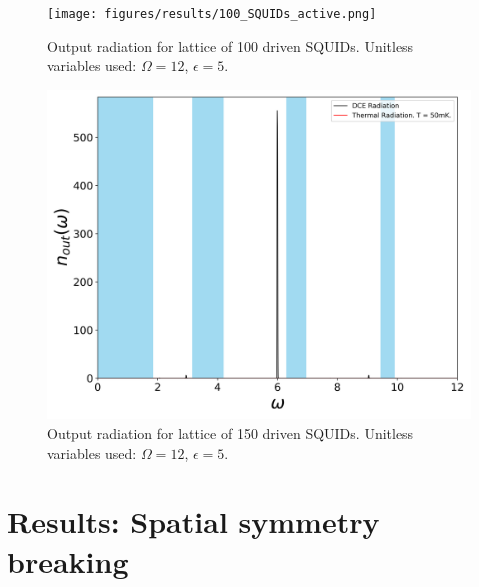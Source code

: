 %
\begin{figure}[h]
    \centering
    \texttt{[image: figures/results/100\_SQUIDs\_active.png]}
    \caption{Output radiation for lattice of 100 driven SQUIDs. Unitless variables used: $\Omega=12$, $\epsilon=5$.}
    \label{fig:100_SQUIDs_active}
\end{figure}
%
\begin{figure}[h]
    \centering
    \includegraphics[width=\textwidth, keepaspectratio]{figures/results/150_SQUIDs_active.png}
    \caption{Output radiation for lattice of 150 driven SQUIDs. Unitless variables used: $\Omega=12$, $\epsilon=5$.}
    \label{fig:150_SQUIDs_active}
\end{figure}
%
\section{Results: Spatial symmetry breaking}\label{sec:results_symmetry_breaking}
%

